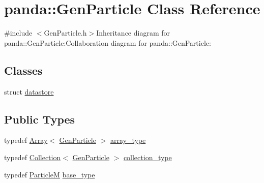 \hypertarget{classpanda_1_1GenParticle}{
\section{panda::GenParticle Class Reference}
\label{classpanda_1_1GenParticle}
}


{\ttfamily \#include $<$GenParticle.h$>$}Inheritance diagram for panda::GenParticle:Collaboration diagram for panda::GenParticle:\subsection*{Classes}
\begin{DoxyCompactItemize}
\item 
struct \hyperlink{structpanda_1_1GenParticle_1_1datastore}{datastore}
\end{DoxyCompactItemize}
\subsection*{Public Types}
\begin{DoxyCompactItemize}
\item 
typedef \hyperlink{classpanda_1_1Array}{Array}$<$ \hyperlink{classpanda_1_1GenParticle}{GenParticle} $>$ \hyperlink{classpanda_1_1GenParticle_acacbe638e5f065cfe0d3bc8ca5ecd5ee}{array\_\-type}
\item 
typedef \hyperlink{classpanda_1_1Collection}{Collection}$<$ \hyperlink{classpanda_1_1GenParticle}{GenParticle} $>$ \hyperlink{classpanda_1_1GenParticle_a2f1d232f5f5660f0c147145d280df831}{collection\_\-type}
\item 
typedef \hyperlink{classpanda_1_1ParticleM}{ParticleM} \hyperlink{classpanda_1_1GenParticle_ab81b9a915960640d959816ecbf1397ec}{base\_\-type}
\end{DoxyCompactItemize}
